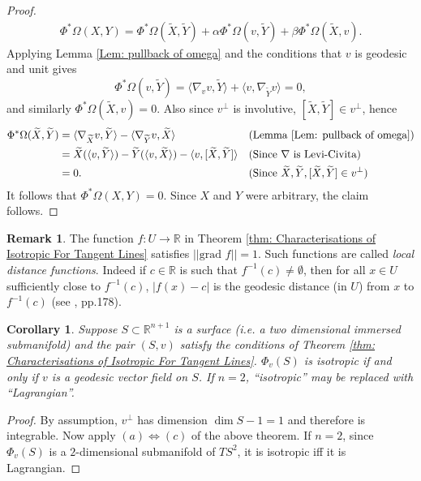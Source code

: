 \documentclass[12pt]{amsart}
\theoremstyle{plain}
\newtheorem{Cor}{Corollary}
\theoremstyle{definition}
\newtheorem{Rem}{Remark}
\def\R{\mathbb{R}}
\numberwithin{equation}{section}
\begin{document}
\begin{proof}
    \begin{align*}
        \Phi^\ast\Omega(X,Y)=\Phi^\ast\Omega(\widetilde{X},\widetilde{Y})+\alpha\Phi^\ast\Omega(v,\widetilde{Y})+\beta\Phi^\ast\Omega(\widetilde{X},v).
    \end{align*}
     Applying Lemma \ref{Lem: pullback of omega} and the conditions that $v$ is geodesic and unit gives
    \[
    \Phi^\ast\Omega(v,\widetilde{Y})=\langle \nabla_vv,\widetilde{Y}\rangle+\langle v,\nabla_{\widetilde{Y}}v\rangle=0,
    \]
    and similarly $\Phi^\ast\Omega(\widetilde{X},v)=0$. Also since $v^\perp$ is involutive, $[\widetilde{X},\widetilde{Y}]\in v^\perp$, hence
    \begin{align*}
        \Phi^\ast\Omega(\widetilde{X},\widetilde{Y})&=\langle \nabla_{\widetilde{X}}v,\widetilde{Y}\rangle-\langle \nabla_{\widetilde{Y}}v,\widetilde{X}\rangle &&\text{(Lemma \ref{Lem: pullback of omega})}\\
        &=\widetilde{X}(\langle v,\widetilde{Y}\rangle)-\widetilde{Y}(\langle v,\widetilde{X}\rangle)-\langle v,[\widetilde{X},\widetilde{Y}]\rangle &&\text{(Since $\nabla$ is Levi-Civita)}\\
        &=0. &&\text{(Since $\widetilde{X},\widetilde{Y}, [\widetilde{X},\widetilde{Y}]\in v^\perp$)}
    \end{align*}
     It follows that $\Phi^\ast\Omega(X,Y)=0$. Since $X$ and $Y$ were arbitrary, the claim follows.
\end{proof}
\begin{Rem}\label{rem: local dist func}
    The function $f:U\to \mathbb{R}$ in Theorem \ref{thm: Characterisations of Isotropic For Tangent Lines} satisfies $||\mbox{grad~}f||=1$. Such functions are called \textit{local distance functions}. Indeed if $c\in\R$ is such that $f^{-1}(c)\neq \emptyset$, then for all $x\in U$ sufficiently close to $f^{-1}(c)$, $|f(x)-c|$ is the geodesic distance (in $U$) from $x$ to $f^{-1}(c)$ (see \cite{Lee18}, pp.178).
\end{Rem}

\begin{Cor}
    Suppose $S\subset \mathbb{R}^{n+1}$ is a surface (i.e. a two dimensional immersed submanifold) and the pair $(S,v)$ satisfy the conditions of Theorem \ref{thm: Characterisations of Isotropic For Tangent Lines}. $\Phi_v(S)$ is isotropic if and only if $v$ is a geodesic vector field on $S$. If $n=2$, ``isotropic'' may be replaced with ``Lagrangian''.
\end{Cor}
\begin{proof}
By assumption, $v^\perp$ has dimension $\dim S-1=1$ and therefore is integrable.  Now apply $(a)\iff (c)$ of the above theorem. If $n=2$, since $\Phi_v(S)$ is a $2$-dimensional submanifold of $TS^2$, it is isotropic iff it is Lagrangian.
\end{proof}
\end{document}
